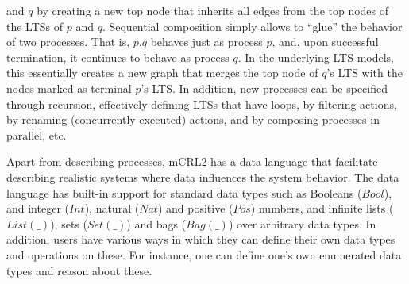 \documentclass[sort&compress,preprint,3p]{elsarticle}
\begin{document}
and \begin{math}q\end{math} by creating a new top node that inherits
all edges from the top nodes of the LTSs of \begin{math}p\end{math}
and \begin{math}q\end{math}.  Sequential composition simply allows to
``glue'' the behavior of two processes. That is, \begin{math}p.q\end{math}
behaves just as process \begin{math}p\end{math}, and, upon successful
termination, it continues to behave as process \begin{math}q\end{math}.
In the underlying LTS models, this essentially creates a new graph that merges the
top node of \begin{math}q\end{math}'s LTS with the
nodes marked as terminal \begin{math}p\end{math}'s LTS.
In addition, new processes can be specified through recursion,
effectively defining LTSs that have loops, by filtering actions, by
renaming (concurrently executed) actions, and by composing processes in
parallel, etc.


Apart from describing processes, mCRL2 has a data language that
facilitate describing realistic systems where data influences the
system behavior.  The data language has built-in support for standard
data types such as Booleans (\begin{math}Bool\end{math}), and integer
(\begin{math}Int\end{math}), natural (\begin{math}Nat\end{math})
and positive (\begin{math}Pos\end{math}) numbers, and infinite lists
(\begin{math}List(\_)\end{math}), sets (\begin{math}Set(\_)\end{math})
and bags (\begin{math}Bag(\_)\end{math}) over arbitrary data types. In
addition, users have various ways in which they can define their own
data types and operations on these. For instance, one can define one's
own enumerated data types and reason about these.
\end{document}
